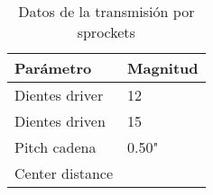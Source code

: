 \begin{table}[h]
\centering
\begin{tabular}{@{}ll@{}}
\toprule
Parámetro       & Magnitud \\ \midrule
Dientes driver  & 12       \\
Dientes driven  & 15       \\
Pitch cadena    & 0.50"    \\
Center distance &          \\ \bottomrule
\end{tabular}
\caption{Datos de la transmisión por sprockets}
\label{tab:parametros_sprockets}
\end{table}
